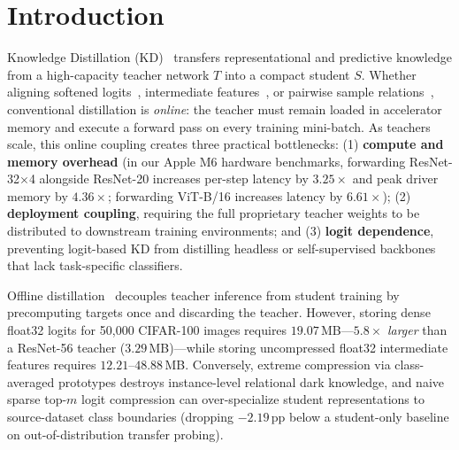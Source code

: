 \documentclass{article}
\begin{document}

\section{Introduction}

Knowledge Distillation (KD)~\citep{hinton2015distilling} transfers representational and predictive knowledge from a high-capacity teacher network $T$ into a compact student $S$. Whether aligning softened logits~\citep{hinton2015distilling,zhao2022dkd}, intermediate features~\citep{romero2015fitnets,zagoruyko2017paying}, or pairwise sample relations~\citep{park2019relational,tian2020crd}, conventional distillation is \emph{online}: the teacher must remain loaded in accelerator memory and execute a forward pass on every training mini-batch. As teachers scale, this online coupling creates three practical bottlenecks: (1) \textbf{compute and memory overhead} (in our Apple M6 hardware benchmarks, forwarding ResNet-32$\times$4 alongside ResNet-20 increases per-step latency by $3.25\times$ and peak driver memory by $4.36\times$; forwarding ViT-B/16 increases latency by $6.61\times$); (2) \textbf{deployment coupling}, requiring the full proprietary teacher weights to be distributed to downstream training environments; and (3) \textbf{logit dependence}, preventing logit-based KD from distilling headless or self-supervised backbones that lack task-specific classifiers.

Offline distillation~\citep{shen2022fkd} decouples teacher inference from student training by precomputing targets once and discarding the teacher. However, storing dense float32 logits for 50,000 CIFAR-100 images requires $19.07$\,MB---$5.8\times$ \emph{larger} than a ResNet-56 teacher ($3.29$\,MB)---while storing uncompressed float32 intermediate features requires $12.21$--$48.88$\,MB. Conversely, extreme compression via class-averaged prototypes destroys instance-level relational dark knowledge, and naive sparse top-$m$ logit compression can over-specialize student representations to source-dataset class boundaries (dropping $-2.19$\,pp below a student-only baseline on out-of-distribution transfer probing).
\end{document}
